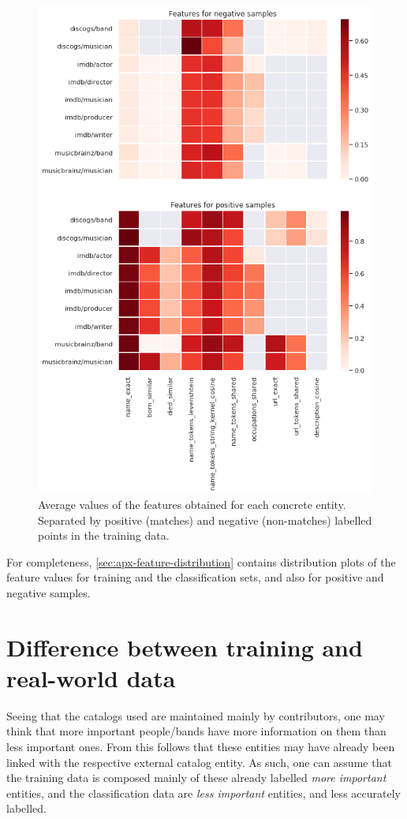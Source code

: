 \documentclass[epsfig,a4paper,11pt,titlepage,twoside,openany]{book}
\begin{document}
\begin{figure}[H]
  \centering \includegraphics[width=.8\textwidth]{feature_heatmap_training_positive_and_negative} 
  \caption{Average values of the features obtained for each concrete entity. Separated by positive (matches) and negative (non-matches) labelled points in the training data.}
  \label{fig:average-features-positive-negative}
\end{figure}

For completeness, \autoref{sec:apx-feature-distribution} contains distribution plots of the feature values for training and the classification sets, and also for positive and negative samples. 


\section{Difference between training and real-world data}
\label{sec:training-real-data-difference}

Seeing that the catalogs used are maintained mainly by contributors, one may think that more important people/bands have more information on them than less important ones. From this follows that these entities may have already been linked with the respective external catalog entity. As such, one can assume that the training data is composed mainly of these already labelled \textit{more important} entities, and the classification data are \textit{less important} entities, and less accurately labelled. 
\end{document}

